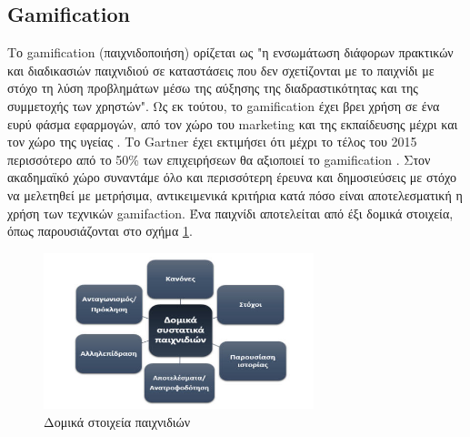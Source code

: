 	\subsection{Gamification}
		Το gamification (παιχνιδοποιήση) ορίζεται ως "η ενσωμάτωση διάφορων πρακτικών και διαδικασιών παιχνιδιού σε καταστάσεις που δεν σχετίζονται με το παιχνίδι με στόχο τη λύση προβλημάτων μέσω της αύξησης της διαδραστικότητας και της συμμετοχής των χρηστών"\cite{Deterding:2011:GDE:2181037.2181040}\cite{Rojas:2013:MPG:2583008.2583033}. Ως εκ τούτου, το gamification έχει βρει χρήση σε ένα ευρύ φάσμα εφαρμογών, από τον χώρο του marketing και της εκπαίδευσης μέχρι και τον χώρο της υγείας \cite{6758978}. Το Gartner έχει εκτιμήσει ότι μέχρι το τέλος του 2015 περισσότερο από το 50\% των επιχειρήσεων θα αξιοποιεί το gamification \cite{gartnerGamification}. Στον ακαδημαϊκό χώρο συναντάμε όλο και περισσότερη έρευνα και δημοσιεύσεις με στόχο να μελετηθεί με μετρήσιμα, αντικειμενικά κριτήρια κατά πόσο είναι αποτελεσματική η χρήση των τεχνικών gamifaction. Ένα παιχνίδι αποτελείται από έξι δομικά στοιχεία, όπως παρουσιάζονται στο σχήμα \ref{fig:gamification_components}.
		
	\begin{figure}[h]
	    \centering
	    \includegraphics[width=0.7\textwidth]{gamification_components.jpg}
	    \caption{Δομικά στοιχεία παιχνιδιών}
	    \label{fig:gamification_components}
	\end{figure}
	
